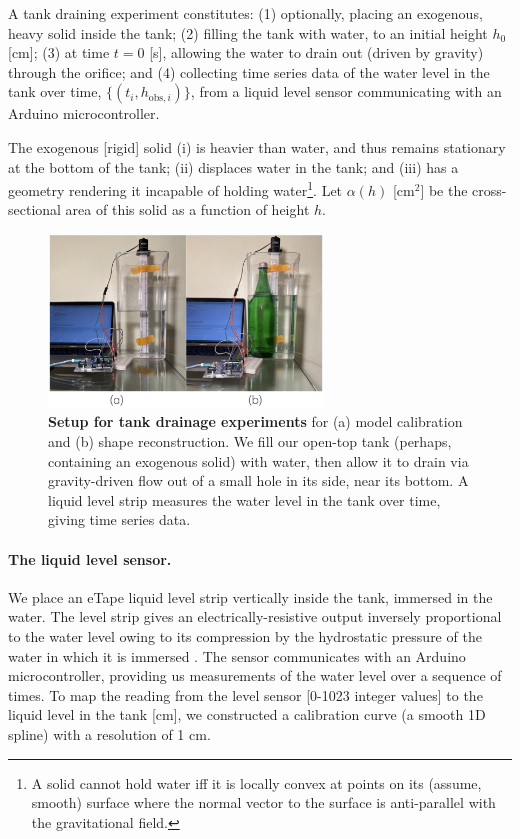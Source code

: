 \documentclass[openacc]{rsproca_new}%
\begin{document}
A tank draining experiment constitutes: 
(1) optionally, placing an exogenous, heavy solid inside the tank; 
(2) filling the tank with water, to an initial height $h_0$ [cm]; 
(3) at time $t=0$ [s], allowing the water to drain out (driven by gravity) through the orifice; and 
(4) collecting time series data of the water level in the tank over time, $\{(t_i, h_{\text{obs}, i}) \}$, from a liquid level sensor communicating with an Arduino microcontroller. 

The exogenous [rigid] solid (i) is heavier than water, and thus remains stationary at the bottom of the tank; (ii) displaces water in the tank; and (iii) has a geometry rendering it incapable of holding water\footnote{A solid cannot hold water iff it is locally convex at points on its (assume, smooth) surface where the normal vector to the surface is anti-parallel with the gravitational field.}. 
Let $\alpha(h)$ [cm$^2$] be the cross-sectional area of this solid as a function of height $h$.

\begin{figure}[h!]
\begin{center}
	\includegraphics[width=0.65\textwidth]{../real_expt/real_expt.png}
	\caption{\textbf{Setup for tank drainage experiments} for (a) model calibration and (b) shape reconstruction.
	We fill our open-top tank (perhaps, containing an exogenous solid) with water, then allow it to drain via gravity-driven flow out of a small hole in its side, near its bottom. A liquid level strip measures the water level in the tank over time, giving time series data.
	}
	\label{fig:photo_of_tank}
\end{center}
\end{figure}

\paragraph{The liquid level sensor.}
We place an eTape\texttrademark\xspace liquid level strip vertically inside the tank, immersed in the water. 
The level strip gives an electrically-resistive output inversely proportional to the water level owing to its compression by the hydrostatic pressure of the water in which it is immersed \cite{eTape}.
The sensor communicates with an Arduino microcontroller, providing us measurements of the water level over a sequence of times. 
To map the reading from the level sensor [0-1023 integer values] to the liquid level in the tank [cm], we constructed a calibration curve (a smooth 1D spline) with a resolution of 1 cm.
\end{document}
